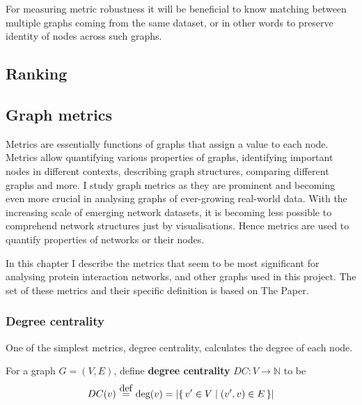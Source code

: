 For measuring metric robustness it will be beneficial to know matching between multiple graphs coming from the same dataset, or in other words to preserve identity of nodes across such graphs.

\subsection{Ranking}

\begin{definition}[Preorder]

\end{definition}

\begin{definition}

\end{definition}

\subsection{Graph metrics}

Metrics are essentially functions of graphs that assign a value to each node.
Metrics allow quantifying various properties of graphs, identifying important nodes in different contexts, describing graph structures, comparing different graphs and more.
I study graph metrics as they are prominent and becoming even more crucial in analysing graphs of ever-growing real-world data.
With the increasing scale of emerging network datasets, it is becoming less possible to comprehend network structures just by visualisations.
Hence metrics are used to quantify properties of networks or their nodes.

In this chapter I describe the metrics that seem to be most significant for analysing protein interaction networks, and other graphs used in this project. The set of these metrics and their specific definition is based on The Paper\cite{Bozhilova2019}.

\subsubsection{Degree centrality}

One of the simplest metrics, degree centrality, calculates the degree of each node.

\begin{definition}
    For a graph $G = (V, E)$, define \textbf{degree centrality} $DC : V \rightarrow \mathbb{N}$ to be
    \[ DC(v) \eqdef \deg(v) = \left| \Set{v' \in V}{(v', v) \in E} \right| \]
\end{definition}

